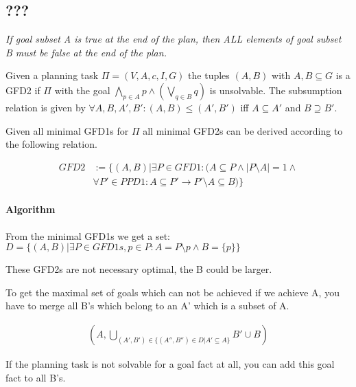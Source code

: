 

\subsection{???}

\textit{If goal subset A is true at the end of the plan, 
then ALL elements of goal subset B must be false at the end of the plan.}\\

\begin{definition}
	Given a planning task $\Pi = (V,A,c,I,G)$ the tuples
	$(A,B)$ with $A,B \subseteq G $ is a GFD2 if 
	$\Pi$ with the goal $\bigwedge_{p \in A} p \wedge (\bigvee_{q \in B} q)$
	is unsolvable. 
	The subsumption relation is given by $\forall A,B,A',B': (A,B) \leq (A',B')$ iff $A \subseteq A'$
	and $B \supseteq B'$.
\end{definition}	

	\noindent
	Given all minimal GFD1s for $\Pi$ all minimal GFD2s can be derived according 
	to the following relation.


	\vspace{-0.3cm}
	\begin{align*}
		GFD2 &:= \{(A,B) | 
				\exists P \in GFD1:(
				   A \subseteq P \wedge |P \setminus A | = 1 \wedge\\
				   &\forall P' \in PPD1:
					  A \subseteq P' \rightarrow P' \setminus A \subseteq B
				)
			 \}
	\end{align*}

\paragraph{Algorithm}
From the minimal GFD1s we get a set:
	$D = \{(A,B) | \exists P \in GFD1s, p \in P: A = P \setminus p \wedge
	B = \{p\}\}$

These GFD2s are not necessary optimal, the B could be larger.


\noindent
To get the maximal set of goals which can not be achieved if we achieve A, 
you have to merge all B's which belong to an A' which is a subset of A. 

\begin{align*}
	(A, \bigcup_{(A', B') \in \{(A'', B'') \in D | A' \subseteq A\}} B' \cup B)
\end{align*}



\noindent
If the planning task is not solvable for a goal fact at all, you can add 
this goal fact to all B's.\\
